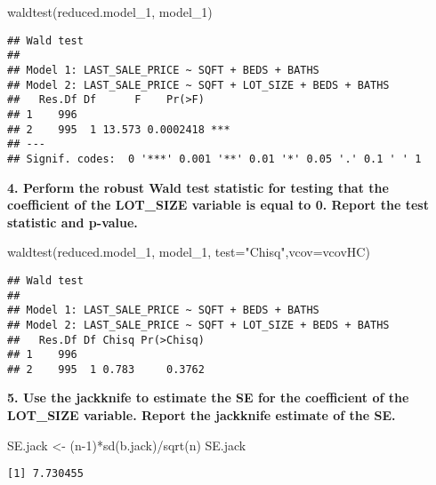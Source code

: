 \documentclass[
]{article}
\newenvironment{Shaded}{\begin{snugshade}}{\end{snugshade}}
\newcommand{\AttributeTok}[1]{\textcolor[rgb]{0.77,0.63,0.00}{#1}}
\newcommand{\DecValTok}[1]{\textcolor[rgb]{0.00,0.00,0.81}{#1}}
\newcommand{\FunctionTok}[1]{\textcolor[rgb]{0.00,0.00,0.00}{#1}}
\newcommand{\NormalTok}[1]{#1}
\newcommand{\OtherTok}[1]{\textcolor[rgb]{0.56,0.35,0.01}{#1}}
\newcommand{\SpecialCharTok}[1]{\textcolor[rgb]{0.00,0.00,0.00}{#1}}
\newcommand{\StringTok}[1]{\textcolor[rgb]{0.31,0.60,0.02}{#1}}
\begin{document}
\begin{Shaded}
\begin{Highlighting}[]
\FunctionTok{waldtest}\NormalTok{(reduced.model\_1, model\_1)}
\end{Highlighting}
\end{Shaded}

\begin{verbatim}
## Wald test
## 
## Model 1: LAST_SALE_PRICE ~ SQFT + BEDS + BATHS
## Model 2: LAST_SALE_PRICE ~ SQFT + LOT_SIZE + BEDS + BATHS
##   Res.Df Df      F    Pr(>F)    
## 1    996                        
## 2    995  1 13.573 0.0002418 ***
## ---
## Signif. codes:  0 '***' 0.001 '**' 0.01 '*' 0.05 '.' 0.1 ' ' 1
\end{verbatim}

\textbf{4. Perform the robust Wald test statistic for testing that the
coefficient of the LOT\_SIZE variable is equal to 0. Report the test
statistic and p-value.}

\begin{Shaded}
\begin{Highlighting}[]
\FunctionTok{waldtest}\NormalTok{(reduced.model\_1, model\_1, }\AttributeTok{test=}\StringTok{"Chisq"}\NormalTok{,}\AttributeTok{vcov=}\NormalTok{vcovHC)}
\end{Highlighting}
\end{Shaded}

\begin{verbatim}
## Wald test
## 
## Model 1: LAST_SALE_PRICE ~ SQFT + BEDS + BATHS
## Model 2: LAST_SALE_PRICE ~ SQFT + LOT_SIZE + BEDS + BATHS
##   Res.Df Df Chisq Pr(>Chisq)
## 1    996                    
## 2    995  1 0.783     0.3762
\end{verbatim}

\textbf{5. Use the jackknife to estimate the SE for the coefficient of
the LOT\_SIZE variable. Report the jackknife estimate of the SE.}

\begin{Shaded}
\begin{Highlighting}[]
\NormalTok{SE.jack }\OtherTok{\textless{}{-}}\NormalTok{ (n}\DecValTok{{-}1}\NormalTok{)}\SpecialCharTok{*}\FunctionTok{sd}\NormalTok{(b.jack)}\SpecialCharTok{/}\FunctionTok{sqrt}\NormalTok{(n)}
\NormalTok{SE.jack}
\end{Highlighting}
\end{Shaded}

\begin{verbatim}
[1] 7.730455
\end{verbatim}
\end{document}
